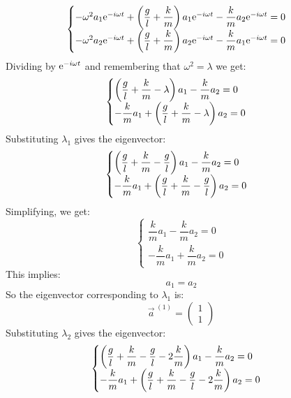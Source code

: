 \begin{equation}
    \begin{cases}
        -\omega^2 a_1 \mathrm{e}^{-i\omega t} + \left(\dfrac{g}{l} + \dfrac{k}{m}\right) a_1 \mathrm{e}^{-i\omega t} - \dfrac{k}{m} a_2 \mathrm{e}^{-i\omega t} = 0\\[5pt]
        -\omega^2 a_2 \mathrm{e}^{-i\omega t} + \left(\dfrac{g}{l} + \dfrac{k}{m}\right) a_2 \mathrm{e}^{-i\omega t} - \dfrac{k}{m} a_1 \mathrm{e}^{-i\omega t} = 0
    \end{cases}
\end{equation}
Dividing by $\mathrm{e}^{-i\omega t}$ and remembering that $\omega^2 = \lambda$ we get:
\begin{equation}
    \begin{cases}
        \left(\dfrac{g}{l} + \dfrac{k}{m} - \lambda\right) a_1 - \dfrac{k}{m} a_2 = 0\\[5pt]
        -\dfrac{k}{m} a_1 + \left(\dfrac{g}{l} + \dfrac{k}{m} - \lambda\right) a_2 = 0
    \end{cases}
\end{equation}
Substituting $\lambda_1$ gives the eigenvector:
\begin{equation}
    \begin{cases}
        \left(\dfrac{g}{l} + \dfrac{k}{m} - \dfrac{g}{l}\right) a_1 - \dfrac{k}{m} a_2 = 0\\[5pt]
        -\dfrac{k}{m} a_1 + \left(\dfrac{g}{l} + \dfrac{k}{m} - \dfrac{g}{l}\right) a_2 = 0
    \end{cases}
\end{equation}
Simplifying, we get:
\begin{equation}
    \begin{cases}
        \dfrac{k}{m} a_1 - \dfrac{k}{m} a_2 = 0\\[5pt]
        -\dfrac{k}{m} a_1 + \dfrac{k}{m} a_2 = 0
    \end{cases}
\end{equation}
This implies:
\begin{equation}
    a_1 = a_2
\end{equation}
So the eigenvector corresponding to $\lambda_1$ is:
\begin{equation}
    \vec{a}^{\;(1)} = \begin{pmatrix}
        1\\
        1
    \end{pmatrix}
\end{equation}
Substituting $\lambda_2$ gives the eigenvector:
\begin{equation}
    \begin{cases}
        \left(\dfrac{g}{l} + \dfrac{k}{m} - \dfrac{g}{l} - 2\dfrac{k}{m}\right) a_1 - \dfrac{k}{m} a_2 = 0\\[5pt]
        -\dfrac{k}{m} a_1 + \left(\dfrac{g}{l} + \dfrac{k}{m} - \dfrac{g}{l} - 2\dfrac{k}{m}\right) a_2 = 0
    \end{cases}
\end{equation}
